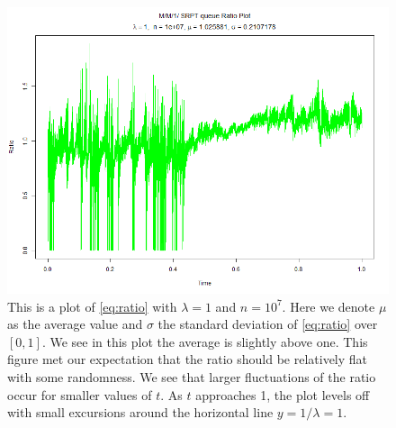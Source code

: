 \documentclass[12pt]{article}
\theoremstyle{plain}
\theoremstyle{definition}
\theoremstyle{remark}
\begin{document}
\begin{figure}[H]
\centering
\includegraphics[width = 460px]{Pictures/ratio1.png}
\caption{This is a plot of \eqref{eq:ratio} with $\lambda = 1$ and $n = 10^{7}$. Here we denote $\mu$ as the average value and $\sigma$ the standard deviation of \eqref{eq:ratio} over $[0,1]$. We see in this plot the average is slightly above one. This figure met our expectation that the ratio should be relatively flat with some randomness. We see that larger fluctuations of the ratio occur for smaller values of $t$. As $t$ approaches 1, the plot levels off with small excursions around the horizontal line $y = 1/\lambda = 1$.}
\label{fig:ratio1}
\end{figure}

\end{document}
